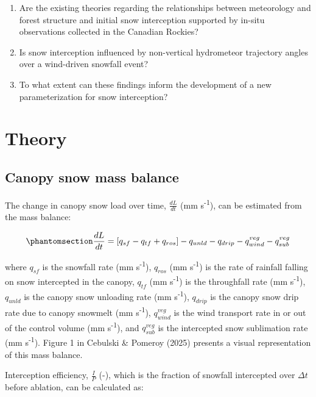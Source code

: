 \documentclass[
  letterpaper,
  DIV=11,
  numbers=noendperiod]{scrartcl}
\begin{document}
\begin{enumerate}
\def\labelenumi{\arabic{enumi}.}
\item
  Are the existing theories regarding the relationships between
  meteorology and forest structure and initial snow interception
  supported by in-situ observations collected in the Canadian Rockies?
\item
  Is snow interception influenced by non-vertical hydrometeor trajectory
  angles over a wind-driven snowfall event?
\item
  To what extent can these findings inform the development of a new
  parameterization for snow interception?
\end{enumerate}

\section{Theory}\label{theory}

\subsection{Canopy snow mass balance}\label{canopy-snow-mass-balance}

The change in canopy snow load over time, \(\frac{dL}{dt}\) (mm
s\textsuperscript{-1}), can be estimated from the mass balance:

\begin{equation}\phantomsection\label{eq-canopy-mass-bal}{
\frac{dL}{dt} = 
[q_{sf} - q_{tf} + q_{ros}] - q_{unld} - q_{drip} - q_{wind}^{veg} - q_{sub}^{veg}
}\end{equation}

where \(q_{sf}\) is the snowfall rate (mm s\textsuperscript{-1}),
\(q_{ros}\) (mm s\textsuperscript{-1}) is the rate of rainfall falling
on snow intercepted in the canopy, \(q_{tf}\) (mm s\textsuperscript{-1})
is the throughfall rate (mm s\textsuperscript{-1}), \(q_{unld}\) is the
canopy snow unloading rate (mm s\textsuperscript{-1}), \(q_{drip}\) is
the canopy snow drip rate due to canopy snowmelt (mm
s\textsuperscript{-1}), \(q_{wind}^{veg}\) is the wind transport rate in
or out of the control volume (mm s\textsuperscript{-1}), and
\(q_{sub}^{veg}\) is the intercepted snow sublimation rate (mm
s\textsuperscript{-1}). Figure 1 in Cebulski \& Pomeroy (2025) presents
a visual representation of this mass balance.

Interception efficiency, \(\frac{I}{P}\) (-), which is the fraction of
snowfall intercepted over \(\Delta t\) before ablation, can be
calculated as:
\end{document}
